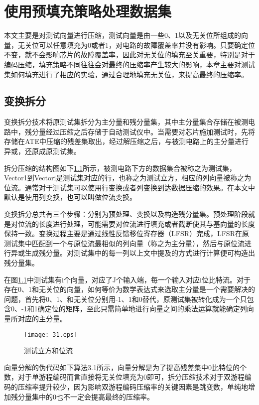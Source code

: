 
\chapter{使用预填充策略处理数据集}

本文主要是对测试向量进行压缩，测试向量是由一些0、1以及无关位所组成的向量，无关位可以任意填充为0或者1，对电路的故障覆盖率并没有影响。只要确定位不变，就不会影响芯片的故障覆盖率，因此对无关位的填充至关重要，特别是对于编码压缩，填充策略不同往往会对最终的压缩率产生较大的影响，本章主要对测试集如何填充进行了相应的实验，通过合理地填充无关位，来提高最终的压缩率。

\section{变换拆分}

变换拆分技术将原测试集拆分为主分量和残分量集，其中主分量集合存储在被测电路中，残分量经过压缩之后存储于自动测试仪中。当需要对芯片施加测试时，先将存储在ATE中压缩的残差集取出，经过解压缩之后，与被测电路上的主分量进行异或，还原成原测试集。

拆分压缩的结构图如下\ref{31}所示，被测电路下方的数据集合被称之为测试集，Vector1到Vectori是测试集对应的行，也称之为测试立方，相应的列向量被称之为位流。通常对于测试集可以使用行变换或者列变换到达数据压缩的效果。在本文中默认是使用列变换，也可以叫做位流变换。

变换拆分总共有三个步骤：分别为预处理、变换以及构造残分量集。预处理阶段就是对位流的长度进行处理，可能需要对位流进行填充或者截断使其与基向量的长度保持一致。变换过程主要是通过线性反馈移位寄存器（LFSR）完成，LFSR在原测试集中匹配到一个与原位流最相似的列向量（称之为主分量），然后与原位流进行异或生成残分量。对测试集中的每一列以上文中提及的方式进行计算便可构造出残分量集。

在图\ref{31}中测试集有i个向量，对应了J个输入端，每一个输入对应i位比特流。对于存在0、1和无关位的向量，如何等价为数学表达式来选取主分量是一个需要解决的问题，首先将0、1、和无关位分别用-1、1和0替代，原测试集被转化成为一个只包含0、-1和1确定位的矩阵，至此只需简单地进行向量之间的乘法运算就能确定列向量所对应的主分量。

\begin{figure}[H]
  \centering
  \texttt{[image: 31.eps]}
  \caption{测试立方和位流}\label{31}
     \end{figure}

向量分解的伪代码如下算法3.1所示，向量分解是为了提高残差集中0比特位的个数，对于单游程编码而言直接将无关位填充为0即可，拆分压缩技术对于双游程编码的压缩率提升较少，因为影响双游程编码压缩率的关键因素是跳变数，单纯地增加残分量集中的0也不一定会提高最终的压缩率。

